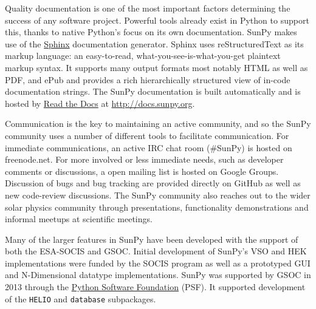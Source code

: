 Quality documentation is
one of the most important factors determining the success of any software project. 
Powerful tools already exist in Python to support this, thanks to native
Python's focus on its own documentation. SunPy makes use of the \href{http://sphinx-doc.org}{Sphinx}
documentation generator. Sphinx uses reStructuredText as its markup language: 
an easy-to-read, what-you-see-is-what-you-get plaintext markup syntax. It supports
many output formats most notably HTML as well as PDF, and ePub and provides a rich
hierarchically structured view of in-code documentation strings. The SunPy documentation 
is built automatically and is hosted by \href{http://readthedocs.org}{Read the 
Docs} at \url{http://docs.sunpy.org}. 

Communication is the key to maintaining an active community, and so the SunPy community 
uses a number of different tools to facilitate communication. For immediate communications, an active IRC chat
room (\#SunPy) is hosted on freenode.net. For more involved or less immediate needs, such as
developer comments or discussions, a open mailing list is hosted on Google Groups. 
Discussion of bugs and bug tracking are provided directly on GitHub as well as new
code-review discussions.  The SunPy community also reaches out to the wider solar physics
community through presentations, functionality demonstrations and informal meetups at scientific
meetings. 

Many of the larger features in SunPy have been developed 
with the support of both the ESA-SOCIS and GSOC. 
Initial development of SunPy's VSO and HEK 
implementations were funded by the SOCIS program as well as a prototyped GUI 
and N-Dimensional datatype implementations. SunPy was supported by GSOC in 2013 
through the \href{http://www.python.org/psf/}{Python Software Foundation} (PSF). It supported development of the 
\texttt{HELIO} and 
\texttt{database} subpackages.

